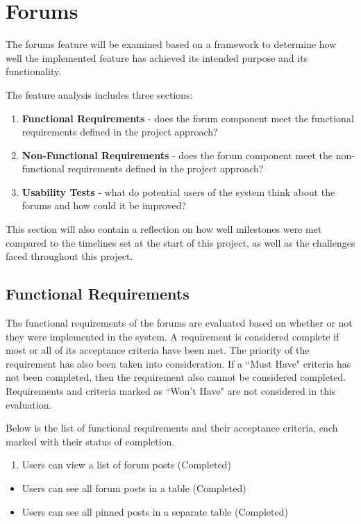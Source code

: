 \section{Forums}

The forums feature will be examined based on a framework to determine how well the implemented feature has achieved its intended purpose and its functionality.

The feature analysis includes three sections:

\begin{enumerate}
    \item \textbf{Functional Requirements} - does the forum component meet the functional requirements defined in the project approach?
    \item \textbf{Non-Functional Requirements} - does the forum component meet the non-functional requirements defined in the project approach?
    \item \textbf{Usability Tests} - what do potential users of the system think about the forums and how could it be improved?
\end{enumerate}

This section will also contain a reflection on how well milestones were met compared to the timelines set at the start of this project, as well as the challenges faced throughout this project.

\subsection{Functional Requirements}
The functional requirements of the forums are evaluated based on whether or not they were implemented in the system.
A requirement is considered complete if most or all of its acceptance criteria have been met.
The priority of the requirement has also been taken into consideration.
If a ``Must Have" criteria has not been completed, then the requirement also cannot be considered completed.
Requirements and criteria marked as ``Won't Have" are not considered in this evaluation.

Below is the list of functional requirements and their acceptance criteria, each marked with their status of completion.

\begin{enumerate}
    \item Users can view a list of forum posts (Completed)
\end{enumerate}
\begin{itemize}
    \setlength{\itemindent}{1.5em}
    \item Users can see all forum posts in a table (Completed)
    \item Users can see all pinned posts in a separate table (Completed)
\end{itemize}

